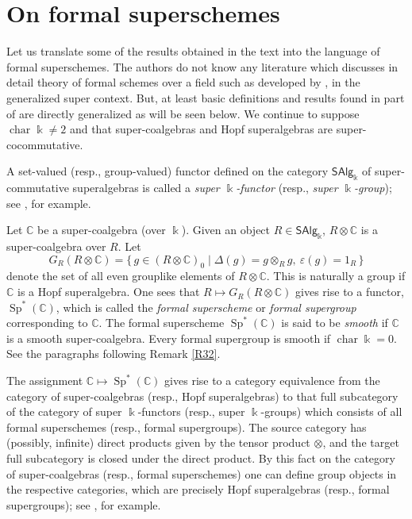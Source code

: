 \documentclass[11pt, a4paper]{amsart}
\theoremstyle{definition}
\numberwithin{equation}{section}
\begin{document}
\appendix
\section{On formal superschemes}
Let us translate some of the results obtained in the text into the language of formal superschemes. 
The authors do not know any literature which discusses in detail theory of formal schemes over
a field such as developed by \cite{T0}, in the generalized super context. 
But, at least basic definitions and results found in part of \cite{T0} are directly generalized as will be seen below. 
We continue to suppose $\operatorname{char} \Bbbk \ne 2$ and that super-coalgebras and Hopf superalgebras are super-cocommutative.

A set-valued (resp., group-valued) functor defined on 
the category $\mathsf{SAlg}_{\Bbbk}$ of super-commutative
superalgebras
is called a \emph{super $\Bbbk$-functor} (resp., \emph{super $\Bbbk$-group}); see \cite[Sect. 3]{MZ},
for example.

Let $\mathbb{C}$ be a super-coalgebra (over $\Bbbk$). 
Given an object $R\in \mathsf{SAlg}_{\Bbbk}$, $R\otimes \mathbb{C}$ is a super-coalgebra over $R$. Let
\[
G_R(R \otimes \mathbb{C})=\{\, g \in (R\otimes\mathbb{C})_0\mid \Delta(g)=g\otimes_R g,\ \varepsilon(g)=1_R\, \}
\]
denote the set of all even grouplike elements of $R\otimes \mathbb{C}$. This is naturally 
a group if $\mathbb{C}$ is a Hopf
superalgebra. 
One sees that $R \mapsto G_R(R \otimes \mathbb{C})$ gives rise to a functor, 
$\operatorname{Sp}^*(\mathbb{C})$,
which is called the \emph{formal superscheme} or \emph{formal supergroup} corresponding to $\mathbb{C}$. 
The formal superscheme $\operatorname{Sp}^*(\mathbb{C})$ is said to be \emph{smooth} if $\mathbb{C}$ is a
smooth super-coalgebra. 
Every formal supergroup is smooth if $\operatorname{char}\Bbbk=0$. 
See the paragraphs following Remark \ref{R32}.

The assignment $\mathbb{C}\mapsto \operatorname{Sp}^*(\mathbb{C})$ gives rise to a category equivalence
from the category of super-coalgebras (resp., Hopf superalgebras) to that full subcategory of the category of
super $\Bbbk$-functors (resp., super $\Bbbk$-groups) which consists
of all formal superschemes (resp., formal supergroups). The source category has (possibly, infinite) 
direct products given by the
tensor product $\otimes$, and the target full subcategory is closed under the direct product. 
By this fact on the category of super-coalgebras (resp., formal superschemes) one can define group objects
in the respective categories, which are precisely Hopf superalgebras (resp., formal supergroups); see \cite[Appendix B]{DNR}, for example. 
\end{document}
